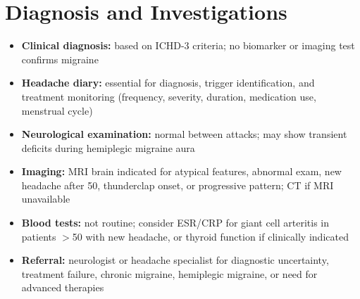 \section*{Diagnosis and Investigations}
\begin{itemize}
    \item \textbf{Clinical diagnosis:} based on ICHD-3 criteria; no biomarker or imaging test confirms migraine
    \item \textbf{Headache diary:} essential for diagnosis, trigger identification, and treatment monitoring (frequency, severity, duration, medication use, menstrual cycle)
    \item \textbf{Neurological examination:} normal between attacks; may show transient deficits during hemiplegic migraine aura
    \item \textbf{Imaging:} MRI brain indicated for atypical features, abnormal exam, new headache after 50, thunderclap onset, or progressive pattern; CT if MRI unavailable
    \item \textbf{Blood tests:} not routine; consider ESR/CRP for giant cell arteritis in patients $>$50 with new headache, or thyroid function if clinically indicated
    \item \textbf{Referral:} neurologist or headache specialist for diagnostic uncertainty, treatment failure, chronic migraine, hemiplegic migraine, or need for advanced therapies
\end{itemize}

